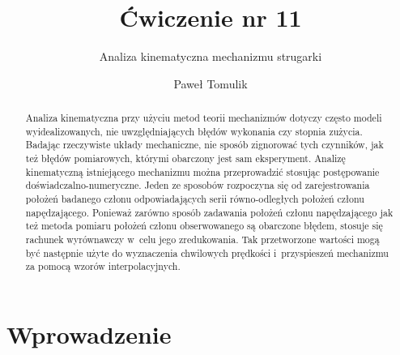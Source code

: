 \documentclass[paper=a4,DIV=12]{tmmlab}
\begin{document}
\title{Ćwiczenie nr 11}
\subtitle{Analiza kinematyczna mechanizmu strugarki}
\author{Paweł Tomulik}
\date{}
\maketitle

\begin{abstract}
  Analiza kinematyczna przy użyciu metod teorii mechanizmów dotyczy często
  modeli wyidealizowanych, nie uwzględniających błędów wykonania czy stopnia
  zużycia. Badając rzeczywiste układy mechaniczne, nie sposób zignorować tych
  czynników, jak też błędów pomiarowych, którymi obarczony jest sam
  eksperyment. Analizę kinematyczną istniejącego mechanizmu można przeprowadzić
  stosując postępowanie doświadczalno-numeryczne. Jeden ze sposobów rozpoczyna
  się od zarejestrowania położeń badanego członu odpowiadających serii
  równo-odległych położeń członu napędzającego. Ponieważ zarówno sposób
  zadawania położeń członu napędzającego jak też metoda pomiaru położeń członu
  obserwowanego są obarczone błędem, stosuje się rachunek wyrównawczy w~celu
  jego zredukowania. Tak przetworzone wartości mogą być następnie użyte do
  wyznaczenia chwilowych prędkości i~przyspieszeń mechanizmu za pomocą wzorów
  interpolacyjnych.
\end{abstract}

\section{Wprowadzenie}
\label{sec:4S1JJ}
\end{document}
